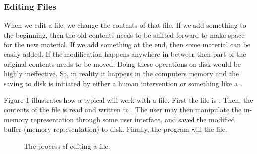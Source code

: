 \subsubsection{Editing Files}

When we edit a file, we change the contents of that file. If we add something to the beginning, then the old contents needs to be shifted forward to make space for the new material. If we add something at the end, then some material can be easily added. If the modification happens anywhere in between then part of the original contents needs to be moved. Doing these operations on disk would be highly ineffective. So, in reality it happens in the computers memory and the saving to disk is initiated by either a human intervention or something like a .

Figure \ref{fig:bg:processes:edit} illustrates how a typical  will work with a file. First the file is . Then, the contents of the file is read and written to . The user may then manipulate the in-memory representation through some user interface, and saved the modified buffer (memory representation) to disk. Finally, the program will  the file.

\begin{figure}[tbp]
  
  \caption{The process of editing a file.}
  \label{fig:bg:processes:edit}
\end{figure}

